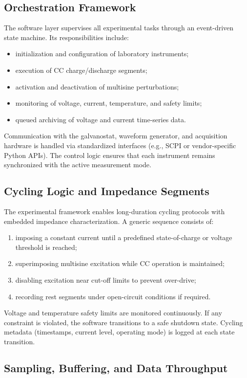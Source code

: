 \subsection{Orchestration Framework}

The software layer supervises all experimental tasks through an event-driven state machine. Its responsibilities include:
\begin{itemize}
    \item initialization and configuration of laboratory instruments;
    \item execution of CC charge/discharge segments;
    \item activation and deactivation of multisine perturbations;
    \item monitoring of voltage, current, temperature, and safety limits;
    \item queued archiving of voltage and current time-series data.
\end{itemize}
Communication with the galvanostat, waveform generator, and acquisition hardware is handled via standardized interfaces (e.g., SCPI or vendor-specific Python APIs). The control logic ensures that each instrument remains synchronized with the active measurement mode.

\subsection{Cycling Logic and Impedance Segments}

The experimental framework enables long-duration cycling protocols with embedded impedance characterization. A generic sequence consists of:
\begin{enumerate}
    \item imposing a constant current until a predefined state-of-charge or voltage threshold is reached;
    \item superimposing multisine excitation while CC operation is maintained;
    \item disabling excitation near cut-off limits to prevent over-drive;
    \item recording rest segments under open-circuit conditions if required.
\end{enumerate}
Voltage and temperature safety limits are monitored continuously. If any constraint is violated, the software transitions to a safe shutdown state. Cycling metadata (timestamps, current level, operating mode) is logged at each state transition.

\subsection{Sampling, Buffering, and Data Throughput}

